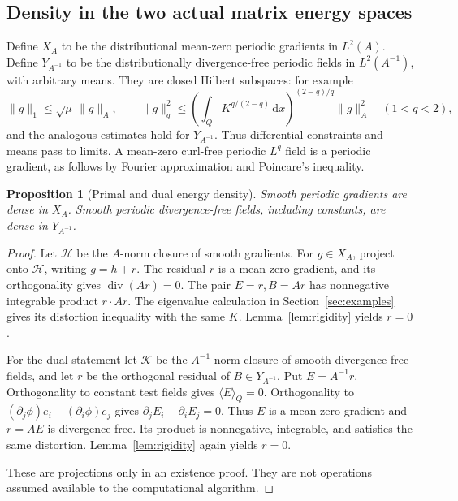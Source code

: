 \documentclass[11pt,a4paper]{article}
\numberwithin{equation}{section}
\newtheorem{proposition}[theorem]{Proposition}
\theoremstyle{definition}
\theoremstyle{remark}\newtheorem{remark}[theorem]{Remark}
\DeclareMathOperator{\diver}{div}
\newcommand{\dd}{\,\mathrm dx}
\newcommand{\mean}[2]{\langle #1\rangle_{#2}}
\newcommand{\norm}[1]{\lVert #1\rVert}
\begin{document}
\subsection{Density in the two actual matrix energy spaces}

Define \(X_A\) to be the distributional mean-zero periodic gradients
in \(L^2(A)\). Define \(Y_{A^{-1}}\) to be the distributionally
divergence-free periodic fields in \(L^2(A^{-1})\), with arbitrary means.
They are closed Hilbert subspaces: for example
\[
 \norm g_1\leq\sqrt\mu\,\norm g_A,\qquad
 \norm g_q^2\leq
 \left(\int_QK^{q/(2-q)}\dd\right)^{(2-q)/q}\norm g_A^2
 \quad(1<q<2),
\]
and the analogous estimates hold for \(Y_{A^{-1}}\).
Thus differential constraints and means pass to limits.
A mean-zero curl-free periodic \(L^q\) field is a periodic gradient,
as follows by Fourier approximation and Poincare's inequality.

\begin{proposition}[Primal and dual energy density]\label{prop:density}
Smooth periodic gradients are dense in \(X_A\).
Smooth periodic divergence-free fields, including constants, are dense
in \(Y_{A^{-1}}\).
\end{proposition}

\begin{proof}
Let \(\mathcal H\) be the \(A\)-norm closure of smooth gradients.
For \(g\in X_A\), project onto \(\mathcal H\), writing \(g=h+r\).
The residual \(r\) is a mean-zero gradient, and its orthogonality gives
\(\diver(Ar)=0\). The pair \(E=r,B=Ar\) has nonnegative integrable
product \(r\cdot Ar\). The eigenvalue calculation in
Section~\ref{sec:examples} gives its distortion inequality with the
same \(K\). Lemma~\ref{lem:rigidity} yields \(r=0\).

For the dual statement let \(\mathcal K\) be the \(A^{-1}\)-norm
closure of smooth divergence-free fields, and let \(r\) be the
orthogonal residual of \(B\in Y_{A^{-1}}\).
Put \(E=A^{-1}r\). Orthogonality to constant test fields gives
\(\mean EQ=0\). Orthogonality to
\((\partial_j\phi)e_i-(\partial_i\phi)e_j\) gives
\(\partial_jE_i-\partial_iE_j=0\).
Thus \(E\) is a mean-zero gradient and \(r=AE\) is divergence free.
Its product is nonnegative, integrable, and satisfies the same distortion.
Lemma~\ref{lem:rigidity} again yields \(r=0\).

These are projections only in an existence proof. They are not operations
assumed available to the computational algorithm.
\end{proof}
\end{document}
